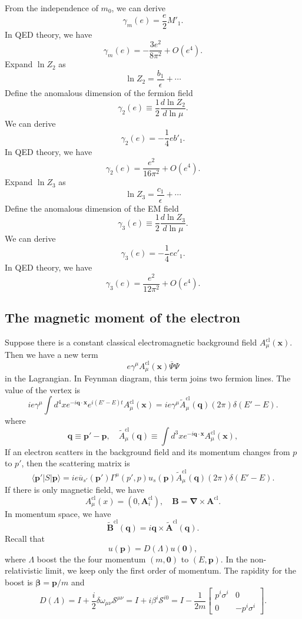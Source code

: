 From the independence of $m_0$, we can derive
\[\gamma_m(e) = \frac{e}{2} M'_1.\]
In QED theory, we have
\[\gamma_m(e) = -\frac{3e^2}{8\pi^2} + O(e^4).\]
Expand $\ln Z_{2}$ as
\[\ln Z_{2} = \frac{b_1}{\epsilon} + \cdots\]
Define the anomalous dimension of the fermion field
\[\gamma_{2}(e) \equiv \frac{1}{2} \frac{d\ln Z_{2}}{d \ln \mu}.\]
We can derive
\[\gamma_{2}(e) = -\frac{1}{4}e b'_1.\]
In QED theory, we have
\[\gamma_2(e) = \frac{e^2}{16\pi^2} + O(e^4).\]
Expand $\ln Z_{3}$ as
\[\ln Z_{3} = \frac{c_1}{\epsilon} + \cdots\]
Define the anomalous dimension of the EM field
\[\gamma_{3}(e) \equiv \frac{1}{2} \frac{d\ln Z_{3}}{d \ln \mu}.\]
We can derive
\[\gamma_{3}(e) = -\frac{1}{4}e c'_1.\]
In QED theory, we have
\[\gamma_3(e) = \frac{e^2}{12\pi^2} + O(e^4).\]

\subsection{The magnetic moment of the electron}
Suppose there is a constant classical electromagnetic background field $A_{\mu}^{\mathrm{cl}}(\bm{x})$. Then we have a new term
\[e\gamma^{\mu}A_{\mu}^{\mathrm{cl}}(\bm{x}) \overline{\Psi}\Psi\]
in the Lagrangian. In Feynman diagram, this term joins two fermion lines. 
The value of the vertex is
\[ie\gamma^{\mu}\int d^4x e^{-i\bm{q}\cdot\bm{x}}e^{i(E'-E)t} A_{\mu}^{\mathrm{cl}}(\bm{x}) = ie\gamma^{\mu}\tilde{A}_{\mu}^{\mathrm{cl}}(\bm{q})(2\pi)\delta(E'-E).\]
where
\[\bm{q} \equiv \bm{p}' - \bm{p} , \quad \tilde{A}_{\mu}^{\mathrm{cl}}(\bm{q}) \equiv \int d^3x e^{-i\bm{q}\cdot\bm{x}} A_{\mu}^{\mathrm{cl}}(\bm{x}),\]
If an electron scatters in the background field and its momentum changes from $p$ to $p'$, then the scattering matrix is
\[\langle \bm{p}' | S | \bm{p} \rangle = ie\overline{u}_{s'}(\bm{p}')\Gamma^{\mu}(p',p)u_s(\bm{p})\tilde{A}_{\mu}^{\mathrm{cl}}(\bm{q})(2\pi)\delta(E'-E).\]
If there is only magnetic field, we have
\[A_{\mu}^{\mathrm{cl}}(x) = (0,\bm{A}_{i}^{\mathrm{cl}}) , \quad \bm{B} = \bm{\nabla} \times \bm{A}^{\mathrm{cl}}.\]
In momentum space, we have
\[\tilde{\bm{B}}^{\mathrm{cl}}(\bm{q}) = i\bm{q}\times\tilde{\bm{A}}^{\mathrm{cl}}(\bm{q}).\]
Recall that
\[u(\bm{p}) = D(\Lambda)u(\bm{0}),\]
where $\Lambda$ boost the the four momentum $(m,\bm{0})$ to $(E,\bm{p})$.
In the non-relativistic limit, we keep only the first order of momentum. The rapidity for the boost is $\bm{\beta} = {\bm{p}}/{m}$ and
\[D(\Lambda) = I + \frac{i}{2}\delta\omega_{\mu\nu}\mathcal{S}^{\mu\nu} = I + i \beta^i \mathcal{S}^{i0} = I - \frac{1}{2m} \begin{bmatrix} p^i \sigma^i  &0\\0& -p^i \sigma^i \end{bmatrix} .\]
